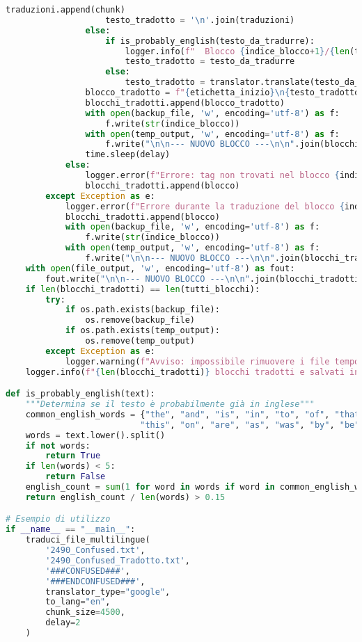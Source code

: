 \documentclass[a4paper,12pt]{article}
\begin{document}
\begin{lstlisting}[language=Python, caption=Versione 1.0 del traduttore]
                            traduzioni.append(chunk)
                    testo_tradotto = '\n'.join(traduzioni)
                else:
                    if is_probably_english(testo_da_tradurre):
                        logger.info(f"  Blocco {indice_blocco+1}/{len(tutti_blocchi)} già in inglese, salto traduzione")
                        testo_tradotto = testo_da_tradurre
                    else:
                        testo_tradotto = translator.translate(testo_da_tradurre)
                blocco_tradotto = f"{etichetta_inizio}\n{testo_tradotto}\n{etichetta_fine}"
                blocchi_tradotti.append(blocco_tradotto)
                with open(backup_file, 'w', encoding='utf-8') as f:
                    f.write(str(indice_blocco))
                with open(temp_output, 'w', encoding='utf-8') as f:
                    f.write("\n\n--- NUOVO BLOCCO ---\n\n".join(blocchi_tradotti))
                time.sleep(delay)
            else:
                logger.error(f"Errore: tag non trovati nel blocco {indice_blocco+1}")
                blocchi_tradotti.append(blocco)
        except Exception as e:
            logger.error(f"Errore durante la traduzione del blocco {indice_blocco+1}: {e}")
            blocchi_tradotti.append(blocco)
            with open(backup_file, 'w', encoding='utf-8') as f:
                f.write(str(indice_blocco))
            with open(temp_output, 'w', encoding='utf-8') as f:
                f.write("\n\n--- NUOVO BLOCCO ---\n\n".join(blocchi_tradotti))
    with open(file_output, 'w', encoding='utf-8') as fout:
        fout.write("\n\n--- NUOVO BLOCCO ---\n\n".join(blocchi_tradotti))
    if len(blocchi_tradotti) == len(tutti_blocchi):
        try:
            if os.path.exists(backup_file):
                os.remove(backup_file)
            if os.path.exists(temp_output):
                os.remove(temp_output)
        except Exception as e:
            logger.warning(f"Avviso: impossibile rimuovere i file temporanei: {e}")
    logger.info(f"{len(blocchi_tradotti)} blocchi tradotti e salvati in '{file_output}'")

def is_probably_english(text):
    """Determina se il testo è probabilmente già in inglese"""
    common_english_words = {"the", "and", "is", "in", "to", "of", "that", "for", "it", "with", 
                           "this", "on", "are", "as", "was", "by", "be", "have", "you", "not"}
    words = text.lower().split()
    if not words:
        return True
    if len(words) < 5:
        return False
    english_count = sum(1 for word in words if word in common_english_words)
    return english_count / len(words) > 0.15

# Esempio di utilizzo
if __name__ == "__main__":
    traduci_file_multilingue(
        '2490_Confused.txt',
        '2490_Confused_Tradotto.txt',
        '###CONFUSED###',
        '###ENDCONFUSED###',
        translator_type="google",
        to_lang="en",
        chunk_size=4500,
        delay=2
    )
\end{lstlisting}
\end{document}
